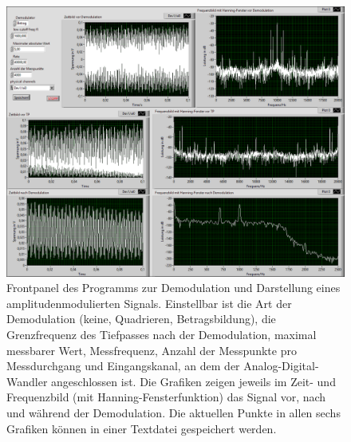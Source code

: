 \documentclass[
a4paper,
12pt,
pagesize,
ngerman
]{scrartcl}
\begin{document}

	\begin{figure}[H]  
		\includegraphics[width=1.0\textwidth]{EIRE2018Dateien/Tag3/modifizierterOszi/Oszilloskop__modifiziertp}
		\centering
		\caption{
			Frontpanel des Programms zur Demodulation und Darstellung eines amplitudenmodulierten Signals.
			Einstellbar ist die Art der Demodulation (keine, Quadrieren, Betragsbildung), die Grenzfrequenz des Tiefpasses nach der Demodulation, maximal messbarer Wert, Messfrequenz, Anzahl der Messpunkte pro Messdurchgang und Eingangskanal, an dem der Analog-Digital-Wandler angeschlossen ist.
			Die Grafiken zeigen jeweils im Zeit- und Frequenzbild (mit Hanning-Fensterfunktion) das Signal vor, nach und während der Demodulation.
			Die aktuellen Punkte in allen sechs Grafiken können in einer Textdatei gespeichert werden.
		}
		\label{fig_tag3_am_demod_front}
		\centering
	\end{figure}
\end{document}
